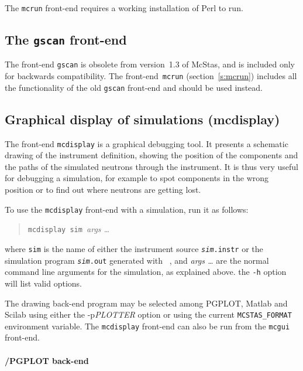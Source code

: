The \verb+mcrun+ front-end requires a working installation of Perl to run.


\subsection{The \texttt{gscan} front-end}
\label{gscan}

The front-end \verb+gscan+ is obsolete from version~1.3 of McStas, and
is included only for backwards compatibility. The front-end~\verb+mcrun+
(section~\ref{s:mcrun}) includes all the functionality of the old
\verb+gscan+ front-end and should be used instead.


\subsection{Graphical display of simulations (mcdisplay)}
\label{s:mcdisplay}

The front-end \verb+mcdisplay+ is a graphical debugging tool.
It presents a schematic drawing of the instrument
definition, showing the position of the components and the paths of the
simulated neutrons through the instrument. It is thus very useful for
debugging a simulation, for example to spot components in the wrong
position or to find out where neutrons are getting lost.

To use the \verb+mcdisplay+ front-end with a simulation, run it as
follows:
\begin{quote}
  \verb+mcdisplay sim +{\it args \ldots}
\end{quote}
where \verb+sim+ is the name of either the instrument source \texttt{{\it sim}.instr} or the simulation program \texttt{{\it sim}.out} generated with
\MCS\ , and \textit{args \ldots} are the normal command line arguments for
the simulation, as explained above. the \verb+-h+ option will list valid options.

The drawing back-end program may be selected among PGPLOT, Matlab and Scilab using either the -p{\it PLOTTER} option or using the current \verb+MCSTAS_FORMAT+ environment variable. 
The \verb+mcdisplay+ front-end can also be run from the \verb+mcgui+ front-end.

\paragraph{\MCS /PGPLOT back-end}

